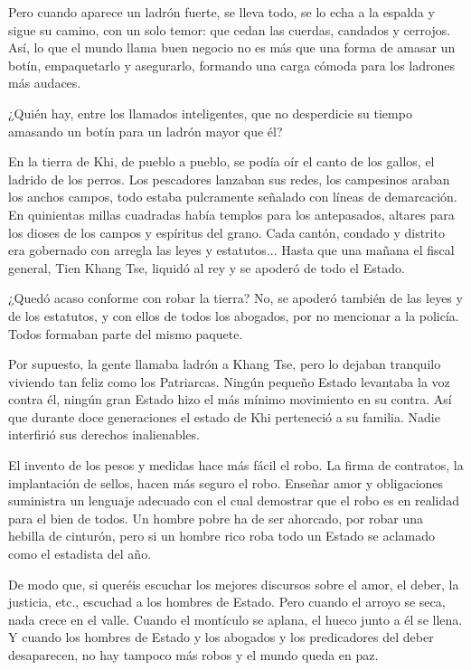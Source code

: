 \documentclass[book,b5paper,hidelinks,final]{memoir}
\begin{document}
	Pero cuando aparece un ladrón fuerte, se lleva todo, se lo echa a la
	espalda y sigue su camino, con un solo temor: que cedan las cuerdas,
	candados y cerrojos. Así, lo que el mundo llama buen negocio no es más
	que una forma de amasar un botín, empaquetarlo y asegurarlo, formando
	una carga cómoda para los ladrones más audaces.
	
	¿Quién hay, entre los llamados inteligentes, que no desperdicie su
	tiempo amasando un botín para un ladrón mayor que él?
	
	En la tierra de Khi, de pueblo a pueblo, se podía oír el canto de los
	gallos, el ladrido de los perros. Los pescadores lanzaban sus redes, los
	campesinos araban los anchos campos, todo estaba pulcramente señalado
	con líneas de demarcación. En quinientas millas cuadradas había templos
	para los antepasados, altares para los dioses de los campos y espíritus
	del grano. Cada cantón, condado y distrito era gobernado con arregla las
	leyes y estatutos... Hasta que una mañana el fiscal general, Tien Khang
	Tse, liquidó al rey y se apoderó de todo el Estado.
	
	¿Quedó acaso conforme con robar la tierra? No, se apoderó también de las
	leyes y de los estatutos, y con ellos de todos los abogados, por no
	mencionar a la policía. Todos formaban parte del mismo paquete.
	
	Por supuesto, la gente llamaba ladrón a Khang Tse, pero lo dejaban
	tranquilo viviendo tan feliz como los Patriarcas. Ningún pequeño Estado
	levantaba la voz contra él, ningún gran Estado hizo el más mínimo
	movimiento en su contra. Así que durante doce generaciones el estado de
	Khi perteneció a su familia. Nadie interfirió sus derechos inalienables.
	
	El invento de los pesos y medidas hace más fácil el robo. La firma de
	contratos, la implantación de sellos, hacen más seguro el robo. Enseñar
	amor y obligaciones suministra un lenguaje adecuado con el cual
	demostrar que el robo es en realidad para el bien de todos. Un hombre
	pobre ha de ser ahorcado, por robar una hebilla de cinturón, pero si un
	hombre rico roba todo un Estado se aclamado como el estadista del año.
	
	De modo que, si queréis escuchar los mejores discursos sobre el amor, el
	deber, la justicia, etc., escuchad a los hombres de Estado. Pero cuando
	el arroyo se seca, nada crece en el valle. Cuando el montículo se
	aplana, el hueco junto a él se llena. Y cuando los hombres de Estado y
	los abogados y los predicadores del deber desaparecen, no hay tampoco
	más robos y el mundo queda en paz.
	
\end{document}
